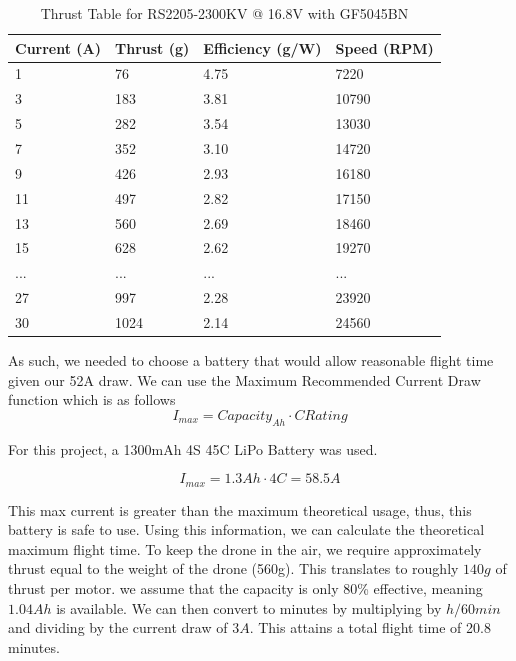 \documentclass{article}
\begin{document}
\begin{table}[h!]
\centering
\begin{tabular}{|l|l|l|l|}
\hline
Current (A) & Thrust (g) & Efficiency (g/W) & Speed (RPM) \\ \hline
1           & 76         & 4.75             & 7220        \\ \hline
3           & 183        & 3.81             & 10790       \\ \hline
5           & 282        & 3.54             & 13030       \\ \hline
7           & 352        & 3.10             & 14720       \\ \hline
9           & 426        & 2.93             & 16180       \\ \hline
11          & 497        & 2.82             & 17150       \\ \hline
13          & 560        & 2.69             & 18460       \\ \hline
15          & 628        & 2.62             & 19270       \\ \hline
...         & ...        & ...              & ...         \\ \hline
27          & 997        & 2.28             & 23920       \\ \hline
30          & 1024       & 2.14             & 24560       \\ \hline
\end{tabular}
\caption{Thrust Table for RS2205-2300KV @ 16.8V with GF5045BN}
\end{table}

As such, we needed to choose a battery that would allow reasonable flight time given our 52A draw. We can use the Maximum Recommended Current Draw function which is as follows
\begin{equation}
I_{max} = Capacity_{Ah} \cdot C Rating
\end{equation}

For this project, a 1300mAh 4S 45C LiPo Battery was used.

\[
I_{max} = 1.3Ah \cdot 4C = 58.5A
\]

This max current is greater than the maximum theoretical usage, thus, this battery is safe to use. Using this information, we can calculate the theoretical maximum flight time. To keep the drone in the air, we require approximately thrust equal to the weight of the drone (560g). This translates to roughly $140g$ of thrust per motor. we assume that the capacity is only 80\% effective, meaning $1.04Ah$ is available. We can then convert to minutes by multiplying by $h/60min$ and dividing by the current draw of $3A$. This attains a total flight time of 20.8 minutes.
\end{document}
